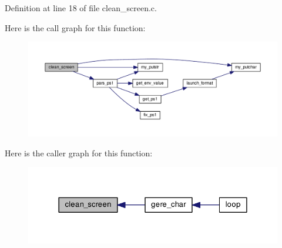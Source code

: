 Definition at line 18 of file clean\-\_\-screen.\-c.



Here is the call graph for this function\-:\nopagebreak
\begin{figure}[H]
\begin{center}
\leavevmode
\includegraphics[width=350pt]{clean__screen_8c_a7a70e74d15838251dcd3b1887c9d3c19_cgraph}
\end{center}
\end{figure}




Here is the caller graph for this function\-:
\nopagebreak
\begin{figure}[H]
\begin{center}
\leavevmode
\includegraphics[width=328pt]{clean__screen_8c_a7a70e74d15838251dcd3b1887c9d3c19_icgraph}
\end{center}
\end{figure}


